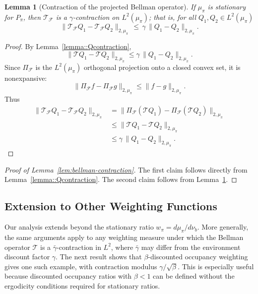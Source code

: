 \documentclass{article}
\theoremstyle{plain}
\newtheorem{lemma}{Lemma}
\theoremstyle{definition}
\theoremstyle{remark}
\begin{document}
\begin{lemma}[Contraction of the projected Bellman operator]
\label{lemma::projected_contraction}
If ${\mu_\pi}$ is stationary for $P_\pi$, then $\mathcal{T}_{\mathcal{F}}$ is a $\gamma$-contraction on $L^2({\mu_\pi})$; that is, for all $Q_1, Q_2 \in L^2({\mu_\pi})$
\[
\|\mathcal{T}_{\mathcal{F}} Q_1 - \mathcal{T}_{\mathcal{F}} Q_2\|_{2,{\mu_\pi}}
\, \le\, \gamma\,\|Q_1 - Q_2\|_{2,{\mu_\pi}}.
\]
\end{lemma}
\begin{proof}
By Lemma~\ref{lemma::Qcontraction},
\[
\|\mathcal{T}Q_1 - \mathcal{T}Q_2\|_{2,{\mu_\pi}}
\le \gamma\,\|Q_1 - Q_2\|_{2,{\mu_\pi}}.
\]
Since $\Pi_{\mathcal F}$ is the $L^2({\mu_\pi})$ orthogonal projection onto a closed
convex set, it is nonexpansive:
\[
\|\Pi_{\mathcal F} f - \Pi_{\mathcal F} g\|_{2,{\mu_\pi}} \le \|f - g\|_{2,{\mu_\pi}}.
\]
Thus
\begin{align*}
    \|\mathcal{T}_{\mathcal{F}}Q_1 - \mathcal{T}_{\mathcal{F}}Q_2\|_{2,{\mu_\pi}}
&= \|\Pi_{\mathcal F}(\mathcal{T}Q_1) - \Pi_{\mathcal F}(\mathcal{T}Q_2)\|_{2,{\mu_\pi}}\\
&\le \|\mathcal{T}Q_1 - \mathcal{T}Q_2\|_{2,{\mu_\pi}}\\
&\le \gamma\,\|Q_1 - Q_2\|_{2,{\mu_\pi}}.
\end{align*}
 
 
\end{proof}


\begin{proof}[Proof of Lemma~\ref{lem:bellman-contraction}]
The first claim follows directly from Lemma~\ref{lemma::Qcontraction}.  
The second claim follows from Lemma~\ref{lemma::projected_contraction}.
\end{proof}

\subsection{Extension to Other Weighting Functions}
\label{app:otherweights}

Our analysis extends beyond the stationary ratio
\(w_\pi=d\mu_\pi/d\nu_b\). More generally, the same arguments apply to any
weighting measure under which the Bellman operator \(\mathcal T\) is a
\(\bar\gamma\)-contraction in \(L^2\), where \(\bar\gamma\) may differ from the
environment discount factor \(\gamma\). The next result shows that
\(\beta\)-discounted occupancy weighting gives one such example, with
contraction modulus \(\gamma/\sqrt{\beta}\). This is especially useful because
discounted occupancy ratios with \(\beta<1\) can be defined without the
ergodicity conditions required for stationary ratios.
\end{document}
